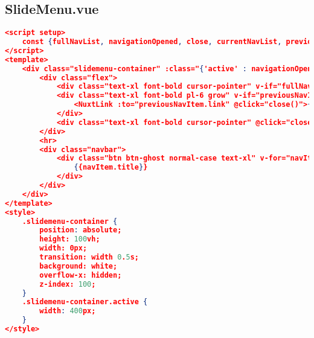 \subsection{SlideMenu.vue}
\label{SlideMenu.vue}

\begin{lstlisting}[language=json,firstnumber=1]
<script setup>
    const {fullNavList, navigationOpened, close, currentNavList, previousNavItem, navigate, back} = useNavigation();
</script>
<template>
    <div class="slidemenu-container" :class="{'active' : navigationOpened}">
        <div class="flex">
            <div class="text-xl font-bold cursor-pointer" v-if="fullNavList != currentNavList" @click="back()">back</div>
            <div class="text-xl font-bold pl-6 grow" v-if="previousNavItem">
                <NuxtLink :to="previousNavItem.link" @click="close()">{{previousNavItem.title}}</NuxtLink>
            </div>
            <div class="text-xl font-bold cursor-pointer" @click="close()">X</div>
        </div>
        <hr>
        <div class="navbar">
            <div class="btn btn-ghost normal-case text-xl" v-for="navItem in currentNavList" :key="navItem.uid" @click="navigate(navItem)">
                {{navItem.title}}
            </div>
        </div>
    </div>
</template>
<style>
    .slidemenu-container {
        position: absolute;
        height: 100vh;
        width: 0px;
        transition: width 0.5s;
        background: white;
        overflow-x: hidden;
        z-index: 100;
    }
    .slidemenu-container.active {
        width: 400px;
    }
</style>
\end{lstlisting}
\clearpage




